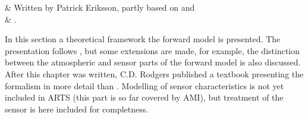 %
%
 \label{sec:formalism}

%
%
 & Written by Patrick Eriksson, partly 
           based on \citet{eriksson:99} and \\ & \citet{eriksson:00a}. \\
\stophistory



%
%
In this section a theoretical framework the forward model is
presented. The presentation follows \citet{rodgers:90}, but some
extensions are made, for example, the distinction between the
atmospheric and sensor parts of the forward model is also discussed.
After this chapter was written, C.D. Rodgers published a textbook
\citep{rodgers:00} presenting the formalism in more detail than
\citet{rodgers:90}. Modelling of sensor characteristics is not yet
included in ARTS (this part is so far covered by AMI), but treatment
of the sensor is here included for completness.



 \label{sec:formalism:fm}
 
